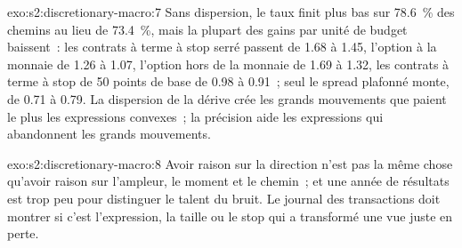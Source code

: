 \begin{solution}{exo:s2:discretionary-macro:7}
Sans dispersion, le taux finit plus bas sur 78.6~\% des chemins au lieu de 73.4~\%, mais la plupart des gains par unité de budget baissent~: les contrats à terme à stop serré passent
de 1.68 à 1.45, l'option à la monnaie de 1.26 à 1.07, l'option hors de la monnaie de 1.69 à 1.32, les contrats à terme à stop de 50 points de base de 0.98 à 0.91~; seul
le spread plafonné monte, de 0.71 à 0.79. La dispersion de la dérive crée les grands mouvements que paient le plus les expressions convexes~; la précision aide
les expressions qui abandonnent les grands mouvements.
\end{solution}

\begin{solution}{exo:s2:discretionary-macro:8}
Avoir raison sur la direction n'est pas la même chose qu'avoir raison sur l'ampleur, le moment et le chemin~; et une année de résultats est trop peu pour distinguer
le talent du bruit. Le journal des transactions doit montrer si c'est l'expression, la taille ou le stop qui a transformé une vue juste en perte.
\end{solution}

